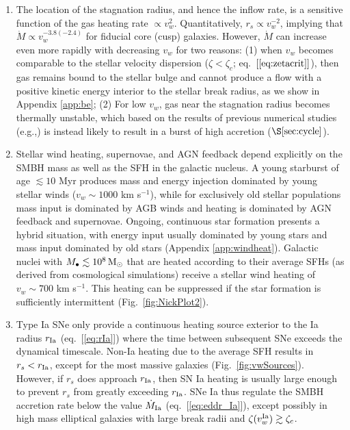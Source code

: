 \documentclass[usenatbib,fleqn]{mn2e}
\newcommand{\Mdot}{\dot{M}}
\newcommand{\rs}{r_s}
\newcommand{\Mbh}[1][]{M_{\bullet#1}}
\newcommand{\rIa}{r_{\rm Ia}}
\begin{document}
\begin{enumerate}
  \item The location of the stagnation radius, and hence the inflow
    rate, is a sensitive function of the gas heating rate $\propto
    v_w^{2}$.  Quantitatively, $\rs\propto v_w^{-2}$, implying that
    $\Mdot\propto v_w^{-3.8 (-2.4)}$ for fiducial core (cusp)
    galaxies.  However, $\Mdot$ can increase even more rapidly with
    decreasing $v_w$ for two reasons: (1) when $v_w$ becomes
    comparable to the stellar velocity dispersion ($\zeta < \zeta_c$;
    eq.~$[\ref{eq:zetacrit}]$), then gas remains bound to the stellar
    bulge and cannot produce a flow with a positive kinetic energy
    interior to the stellar break radius, as we show in Appendix
    \ref{app:be}; (2) For low $v_w$, gas near the stagnation radius
    becomes thermally unstable, which based on the results of previous
    numerical studies (e.g.,\citealt{Ciotti+10}) is instead likely to
    result in a burst of high accretion ($\S\ref{sec:cycle}$).

  \item Stellar wind heating, supernovae, and AGN feedback depend
    explicitly on the SMBH mass as well as the SFH in the galactic
    nucleus.  A young starburst of age $\lesssim 10$ Myr produces mass
    and energy injection dominated by young stellar winds ($v_w \sim
    1000$ km s$^{-1}$), while for exclusively old stellar populations
    mass input is dominated by AGB winds and heating is dominated by
    AGN feedback and supernovae.  Ongoing, continuous star formation
    presents a hybrid situation, with energy input usually dominated
    by young stars and mass input dominated by old stars (Appendix
    \ref{app:windheat}).  Galactic nuclei with $\Mbh \lesssim
    10^8\Msun$ that are heated according to their average SFHs (as
    derived from cosmological simulations) receive a stellar wind
    heating of $v_w \sim 700$ km s$^{-1}$.  This heating can be
    suppressed if the star formation is sufficiently intermittent
    (Fig.~\ref{fig:NickPlot2}).

\item Type Ia SNe only provide a continuous heating source exterior to
  the Ia radius $\rIa$ (eq.~[\ref{eq:rIa}]) where the time between
  subsequent SNe exceeds the dynamical timescale.  Non-Ia heating due
  to the average SFH results in $\rs <\rIa$, except for the most
  massive galaxies (Fig.~\ref{fig:vwSources}).  However, if $\rs$ does
  approach $\rIa$, then SN Ia heating is usually
  large enough to prevent $\rs$ from greatly exceeding $\rIa$.
  SNe Ia thus regulate the SMBH accretion rate below the value
  $\dot{M}_{\rm Ia}$ (eq.~[\ref{eq:eddr_Ia}]), except possibly in high
  mass elliptical galaxies with large break radii and $\zeta(v_w^{\rm
    Ia}) \gtrsim \zeta_c$.


\end{enumerate}
\end{document}
